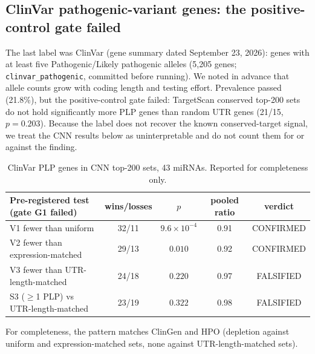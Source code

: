\subsection{ClinVar pathogenic-variant genes: the positive-control gate failed}
The last label was ClinVar (gene summary dated September 23, 2026): genes with at least five Pathogenic/Likely pathogenic alleles (5,205 genes; \texttt{clinvar\_pathogenic}, committed before running). We noted in advance that allele counts grow with coding length and testing effort. Prevalence passed (21.8\%), but the positive-control gate failed: TargetScan conserved top-200 sets do not hold significantly more PLP genes than random UTR genes (21/15, $p=0.203$). Because the label does not recover the known conserved-target signal, we treat the CNN results below as uninterpretable and do not count them for or against the finding.
\begin{table}[h]\centering\small\begin{tabular}{lcccc}\hline Pre-registered test (gate G1 failed) & wins/losses & $p$ & pooled ratio & verdict\\\hline
V1 fewer than uniform & 32/11 & $9.6\times10^{-4}$ & 0.91 & CONFIRMED \\
V2 fewer than expression-matched & 29/13 & $0.010$ & 0.92 & CONFIRMED \\
V3 fewer than UTR-length-matched & 24/18 & $0.220$ & 0.97 & FALSIFIED \\
S3 ($\geq$1 PLP) vs UTR-length-matched & 23/19 & $0.322$ & 0.98 & FALSIFIED \\
\hline\end{tabular}\caption{ClinVar PLP genes in CNN top-200 sets, 43 miRNAs. Reported for completeness only.}\label{tab:clinvar}\end{table}
For completeness, the pattern matches ClinGen and HPO (depletion against uniform and expression-matched sets, none against UTR-length-matched sets).
